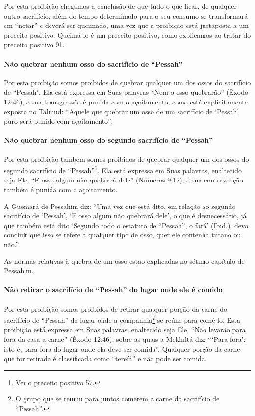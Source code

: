 Por esta proibição chegamos à conclusão de que tudo o que ficar, de
qualquer outro sacrifício, além do tempo determinado para o seu consumo
se transformará em ``notar'' e deverá ser queimado, uma vez que a
proibição está justaposta a um preceito positivo. Queimá-lo é um
preceito positivo, como explicamos ao tratar do preceito positivo 91.

\paragraph{Não quebrar nenhum osso do sacrifício de ``Pessah''}

Por esta proibição somos proibidos de quebrar qualquer um dos ossos do
sacrifício de ``Pessah''. Ela está expressa em Suas palavras ``Nem o
osso quebrarão'' (Êxodo 12:46), e sua transgressão é punida com o
açoitamento, como está explicitamente exposto no Talmud: ``Aquele que
quebrar um osso de um sacrifício de `Pessah' puro será punido com
açoitamento''.


\paragraph{Não quebrar nenhum osso do segundo sacrifício de ``Pessah''}

Por esta proibição também somos proibidos de quebrar qualquer um dos
ossos do segundo sacrifício de ``Pessah''\footnote{Ver o preceito positivo 57.}. Ela
está expressa em Suas palavras, enaltecido seja Ele, ``E osso algum não
quebrará dele'' (Números 9:12), e sua contravenção também é punida com o
açoitamento.

A Guemará de Pessahim diz: ``Uma vez que está dito, em relação ao
segundo sacrifício de `Pessah', `E osso algum não quebrará dele', o que
é desnecessário, já que também está dito `Segundo todo o estatuto de
``Pessah'', o fará' (Ibid.), devo concluir que isso se refere a qualquer
tipo de osso, quer ele contenha tutano ou não.''

As normas relativas à quebra de um osso estão explicadas no sétimo
capítulo de Pessahim.

\paragraph{Não retirar o sacrifício de ``Pessah'' do lugar onde ele é comido}

Por esta proibição somos proibidos de retirar qualquer porção da carne
do sacrifício de ``Pessah'' do lugar onde a
companhia\footnote{O grupo que se reuniu para juntos comerem a carne do sacrifício de
  ``Pessah''.} se reúne para comê-lo. Esta proibição
está expressa em Suas palavras, enaltecido seja Ele, ``Não levarão para
fora da casa a carne'' (Êxodo 12:46), sobre as quais a Mekhiltá diz:
```Para fora': isto é, para fora do lugar onde ela deve ser comida''.
Qualquer porção da carne que for retirada é classificada como ``terefá''
e não pode ser comida.

